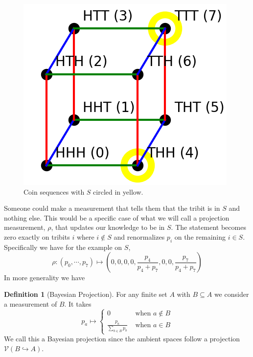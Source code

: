 \documentclass[12pt,a4paper]{article}
\theoremstyle{myrule}
\theoremstyle{postulate}
\theoremstyle{definition}
\newtheorem{definition}{Definition}[section]
\begin{document}
\begin{figure}[h]
\centering
\includegraphics[scale=0.6]{cube.png}
\caption{Coin sequences with $S$ circled in yellow.}
\end{figure}

Someone could make a measurement that tells them that the tribit is in $S$ and nothing else.  This would be a specific case of what we will call a projection measurement, $\rho$, that updates our knowledge to be in $S$.  The statement becomes zero exactly on tribits $i$ where $i \not \in S$ and renormalizes $p_i$ on the remaining $i \in S$.  Specifically we have for the example on $S$, 
\begin{equation}
\label{sdist}
\rho: (p_0,\cdots,p_7) \mapsto \left(0,0,0,0, \frac{p_4}{p_4 + p_7},0,0,\frac{p_7}{p_4 + p_7}\right)
\end{equation}
In more generality we have
\begin{definition}[Bayesian Projection]
\label{projdef}
For any finite set $A$ with $B \subseteq A$ we consider a measurement of $B$.  It takes
\[
p_a \mapsto \left\{ \begin{array}{cc} 0 &\text{ when } a \not \in B \\ \frac{p_a}{\sum_{b \in B} p_b} & \text{ when } a \in B \end{array} \right.
\]
We call this a Bayesian projection since the ambient spaces follow a projection $\mathcal{V}(B \hookrightarrow A)$.
\end{definition}
\end{document}
